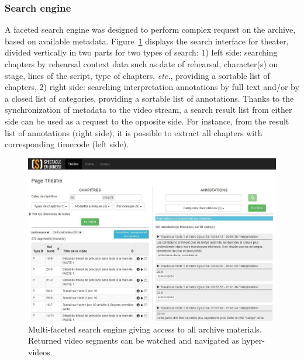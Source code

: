 \documentclass[conference]{IEEEtran}
\newcommand{\todo}[1]{\noindent\textcolor{red}{{\bf \{ToDo} #1{\bf \}}}}
\begin{document}
\subsubsection{Search engine}
A faceted search engine was designed to perform complex request on the archive, based on available metadata.
Figure~\ref{fig:searchengine} displays the search interface for theater, divided vertically in two parts for two types of search:
1) left side: searching chapters by rehearsal context data such as date of rehearsal, character(s) on stage, lines of the script, type of chapters, \emph{etc.}, providing a sortable list of chapters,
2) right side: searching interpretation annotations by full text and/or by a closed list of categories, providing a sortable list of annotations. Thanks to the synchronization of metadata to the video stream, a search result list from either side can be used as a request to the opposite side. For instance, from the result list of annotations (right side), it is possible to extract all chapters with corresponding timecode (left side).

\begin{figure}[htb!]
  \centering
  \includegraphics[width=\columnwidth]{searchengine}
  \caption{Multi-faceted search engine giving access to all archive materials. 
  Returned video segments can be watched and navigated as hyper-videos.}  %
  \label{fig:searchengine}
\end{figure}


\end{document}
